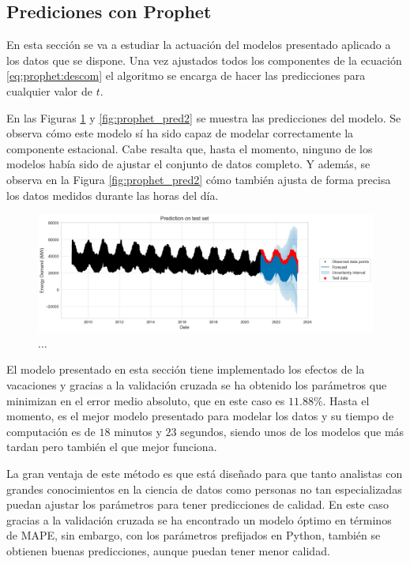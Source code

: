 \documentclass[12pt,twoside]{article}
\begin{document}
\subsection{Prediciones con Prophet}
En esta sección se va a estudiar la actuación del modelos presentado aplicado a los datos que se dispone. Una vez ajustados todos los componentes de la ecuación \eqref{eq:prophet:descom} el algoritmo se encarga de hacer las predicciones para cualquier valor de $t$.

En las Figuras \ref{fig:prophet_predition} y \ref{fig:prophet_pred2} se muestra las predicciones del modelo. Se observa cómo este modelo sí ha sido capaz de modelar correctamente la componente estacional. Cabe resalta que, hasta el momento, ninguno de los modelos había sido de ajustar el conjunto de datos completo. Y además, se observa en la Figura \ref{fig:prophet_pred2} cómo también ajusta de forma precisa los datos medidos durante las horas del día.

\begin{center}
\begin{figure}[h]
    \includegraphics[width = \textwidth]{imagenes/prophet_predition.png}
    \caption{...}\label{fig:prophet_predition}
\end{figure}
\end{center}

El modelo presentado en esta sección tiene implementado los efectos de la vacaciones y gracias a la validación cruzada se ha obtenido los parámetros que minimizan en el error medio absoluto, que en este caso es $11.88\%$. Hasta el momento, es el mejor modelo presentado para modelar los datos y su tiempo de computación es de $18$ minutos y $23$ segundos, siendo unos de los modelos que más tardan pero también el que mejor funciona.

La gran ventaja de este método es que está diseñado para que tanto analistas con grandes conocimientos en la ciencia de datos como personas no tan especializadas puedan ajustar los parámetros para tener predicciones de calidad. En este caso gracias a la validación cruzada se ha encontrado un modelo óptimo en términos de MAPE, sin embargo, con los parámetros prefijados en Python, también se obtienen buenas predicciones, aunque puedan tener menor calidad. 
\end{document}
